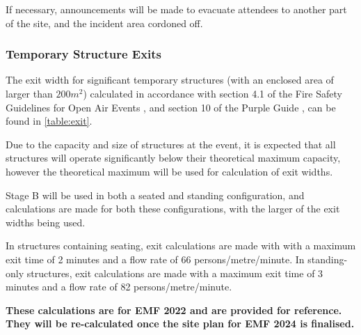 If necessary, announcements will be made to evacuate attendees to another part of the
site, and the incident area cordoned off.

\subsubsection{Temporary Structure Exits}

The exit width for significant temporary structures (with an enclosed area of larger than
$200m^2$) calculated in accordance with section 4.1 of the Fire Safety Guidelines
for Open Air Events \cite{firesafety}, and section 10 of the Purple Guide \cite{purpleguide},
can be found in \cref{table:exit}.

Due to the capacity and size of structures at the event, it is expected that all structures will operate
significantly below their theoretical maximum capacity, however the theoretical maximum will be
used for calculation of exit widths.

Stage B will be used in both a seated and standing configuration, and calculations are made for
both these configurations, with the larger of the exit widths being used.

In structures containing seating, exit calculations are made with
with a maximum exit time of 2 minutes and a flow rate of 66 persons/metre/minute. In
standing-only structures, exit calculations are made with a maximum exit time of 3 minutes and a
flow rate of 82 persons/metre/minute.

\textbf{These calculations are for EMF 2022 and are provided for reference. They will be re-calculated once the site plan for EMF 2024 is finalised.}

